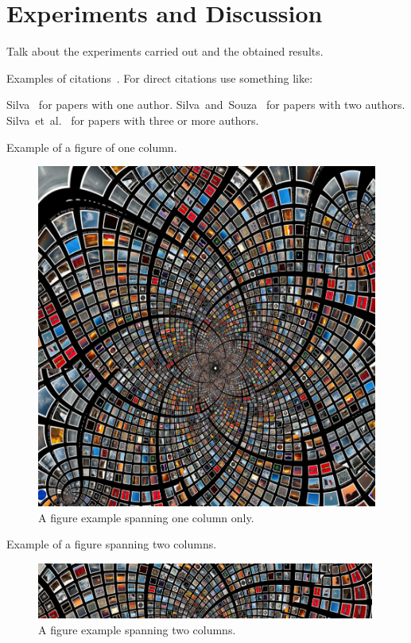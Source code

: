 \documentclass[10pt,twocolumn,letterpaper]{article}
\newcommand{\CITEONE}[2]{\mbox{#1 \cite{#2}}}
\newcommand{\CITETWO}[3]{\mbox{#1 and #2 \cite{#3}}}
\newcommand{\CITEN}[2]{\mbox{#1 et al. \cite{#2}}}
\begin{document}
\section{Experiments and Discussion}
Talk about the experiments carried out and the obtained results. 

Examples of citations~\cite{Ni_2008, Ni_2009}. For direct citations use something like: 

\CITEONE{Silva}{Silva_2010} for papers with one author.
\CITETWO{Silva}{Souza}{Silva_2010b} for papers with two authors.
\CITEN{Silva}{Silva_2010c} for papers with three or more authors.

Example of a figure of one column. 
\begin{figure}
\begin{center}
	\includegraphics[width=0.99\columnwidth]{pics/example-figure}
	\caption{A figure example spanning one column only.\label{fig:label}}   
\end{center} 
\end{figure}   

Example of a figure spanning two columns. 
\begin{figure}
\begin{center}
	\includegraphics[width=0.99\textwidth]{pics/example-figure-spanned}
	\caption{A figure example spanning two columns.\label{fig:label2}}   
\end{center} 
\end{figure}
\end{document}
